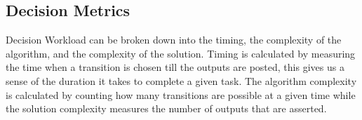 \subsection{Decision Metrics}
Decision Workload can be broken down into the timing, the complexity of the algorithm, and the complexity of the solution. Timing is calculated by measuring the time when a transition is chosen till the outputs are posted, this gives us a sense of the duration it takes to complete a given task. The algorithm complexity is calculated by counting how many transitions are possible at a given time while the solution complexity measures the number of outputs that are asserted.
